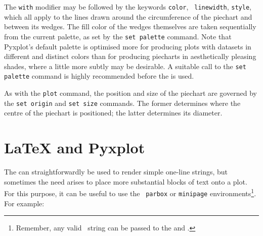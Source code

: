 The {\tt with} modifier may be followed by the keywords {\tt color}, {\tt
linewidth}, {\tt style}, which all apply to the lines drawn around the
circumference of the piechart and between its wedges. The fill color of the
wedges themselves are taken sequentially from the current palette, as set by
the {\tt set palette} command. Note that Pyxplot's default palette is optimised
more for producing plots with datasets in different and distinct colors than
for producing piecharts in aesthetically pleasing shades, where a little more
subtly may be desirable. A suitable call to the {\tt set palette} command is
highly recommended before the  is used.

As with the {\tt plot} command, the position and size of the piechart are
governed by the {\tt set origin} and {\tt set size} commands. The former
determines where the centre of the piechart is positioned; the latter
determines its diameter.


\section{LaTeX and Pyxplot}

The  can straightforwardly be used to render simple one-line
\latexdcf{} strings, but sometimes the need arises to place more
substantial blocks of text onto a plot. For this purpose, it can be useful to
use the \latexdcf\ {\tt parbox} or {\tt minipage} environments\footnote{Remember,
any valid \latexdcf\ string can be passed to the  and .}. For example:


